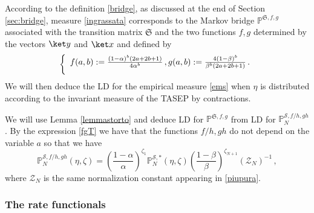 \documentclass[reqno]{amsart}
\theoremstyle{plain}
\theoremstyle{definition}
\theoremstyle{remark}
\numberwithin{equation}{section}
\numberwithin{theorem}{section}
\def\\{\par\medskip}
\newcommand{\<}{\langle}
\renewcommand{\>}{\rangle}
\begin{document}
	
	
	
	
	According to the definition \eqref{bridge}, as discussed at the end of Section \ref{sec:bridge}, measure \eqref{ingrassata} corresponds to the Markov bridge $\mathbb P^{\mathfrak S,f,g}$ associated with the transition matrix $\mathfrak S$ and the two functions $f,g$ determined by the vectors $\ket y$ and $\ket x$ and defined by 
	\begin{equation}\label{fgT}
		\left\{
		\begin{array}{l}
			f(a,b):=\frac{(1-\alpha)^{b}(2a+2b+1)}{4\alpha^{b}}\,,\\
			g(a,b):=\frac{4(1-\beta)^{b}}{\beta^{b}(2a+2b+1)}\,.
		\end{array}
		\right.
	\end{equation} 
	We will then deduce the LD for the empirical measure \eqref{ems} when $\eta$ is distributed according to the invariant measure of the TASEP by contractions.
	
	
	
	
	We will use Lemma \ref{lemmastorto} and deduce LD for $\mathbb P^{\mathfrak S,f,g}$ from LD for $\mathbb P^{\mathcal S,f/h,gh}_{N}$. By the expression
	\eqref{fgT} we have that the functions $f/h,gh$ do not depend on the variable $a$ so that we have
	\begin{equation}\label{bridgecompact}
		\mathbb P^{\mathcal S,f/h,gh}_{N}(\eta,\zeta)=\left(\frac{1-\alpha}{\alpha}\right)^{\zeta_1}\mathbb P^{\mathcal S,*}_N(\eta,\zeta)\left(\frac{1-\beta}{\beta}\right)^{\zeta_{N+1}} \left(\mathcal Z_N\right)^{-1}\,,
	\end{equation}
	where $\mathcal Z_N$ is the same normalization constant appearing in \eqref{piupura}.
	
	
	\subsubsection{The rate functionals}
	
\end{document}
